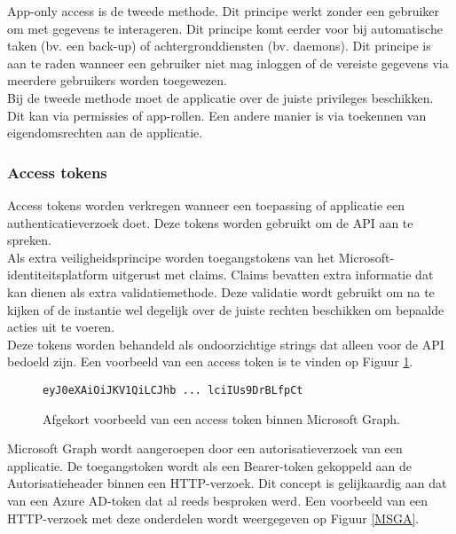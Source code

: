 App-only access is de tweede methode. Dit principe werkt zonder een gebruiker om met gegevens te interageren. Dit principe komt eerder voor bij automatische taken (bv. een back-up) of achtergronddiensten (bv. daemons). Dit principe is aan te raden wanneer een gebruiker niet mag inloggen of de vereiste gegevens via meerdere gebruikers worden toegewezen. \\

Bij de tweede methode moet de applicatie over de juiste privileges beschikken. Dit kan via permissies of app-rollen. Een andere manier is via toekennen van eigendomsrechten aan de applicatie. 

\subsubsection{Access tokens}

Access tokens worden verkregen wanneer een toepassing of applicatie een authenticatieverzoek doet. Deze tokens worden gebruikt om de \ac{API} aan te spreken. \\

Als extra veiligheidsprincipe worden toegangstokens van het Microsoft-\newline
identiteitsplatform uitgerust met claims. Claims bevatten extra informatie dat kan dienen als extra validatiemethode. Deze validatie wordt gebruikt om na te kijken of de instantie wel degelijk over de juiste rechten beschikken om bepaalde acties uit te voeren. \\

Deze tokens worden behandeld als ondoorzichtige strings dat alleen voor de \ac{API} bedoeld zijn. Een voorbeeld van een access token is te vinden op Figuur \ref{MSGAT}. \\

\begin{figure}[h]
    \footnotesize\begin{verbatim}eyJ0eXAiOiJKV1QiLCJhb ... lciIUs9DrBLfpCt
\end{verbatim}    
    \caption[Afgekort voorbeeld Microsoft Graph access token]{Afgekort voorbeeld van een access token binnen Microsoft Graph.}
    \label{MSGAT}
\end{figure}

Microsoft Graph wordt aangeroepen door een autorisatieverzoek van een applicatie. De toegangstoken wordt als een Bearer-token gekoppeld aan de Autorisatieheader binnen een \ac{HTTP}-verzoek. Dit concept is gelijkaardig aan dat van een Azure \ac{AD}-token dat al reeds besproken werd. Een voorbeeld van een \ac{HTTP}-verzoek met deze onderdelen wordt weergegeven op Figuur \ref{MSGA}. \\

